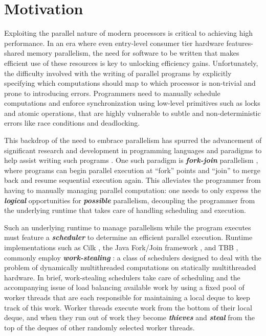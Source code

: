 \documentclass[bsc,frontabs,singlespacing,parskip,deptreport,normalheadings]{infthesis}
\begin{document}
\section{Motivation}

Exploiting the parallel nature of modern processors is critical to achieving
high performance. In an era where even entry-level consumer tier hardware
features-shared memory parallelism, the need for software to be written that
makes efficient use of these resources is key to unlocking efficiency gains.
Unfortunately, the difficulty involved with the writing of parallel programs by
explicitly specifying which computations should map to which processor is
non-trivial and prone to introducing errors. Programmers need to manually
schedule computations and enforce synchronization using low-level primitives
such as locks and atomic operations, that are highly vulnerable to subtle and
non-deterministic errors like race conditions and deadlocking.

This backdrop of the need to embrace parallelism has spurred the advancement of
significant research and development in programming languages and paradigms to
help assist writing such programs \cite{muller_latency-hiding_2016,
zakian_concurrent_2016}. One such paradigm is \textit{\textbf{fork-join}}
parallelism \cite{conway_multiprocessor_1963, nyman_notes_2016}, where programs
can begin parallel execution at ``fork'' points and ``join'' to merge back and
resume sequential execution again. This alleviates the programmer from having to
manually managing parallel computation: one needs to only express the
\textbf{\textit{logical}} opportunities for \textit{\textbf{possible}}
parallelism, decoupling the programmer from the underlying runtime that takes
care of handling scheduling and execution.

Such an underlying runtime to manage parallelism while the program executes must
feature a \textit{\textbf{scheduler}} to determine an efficient parallel
execution. Runtime implementations such as Cilk
\cite{frigo_implementation_1998}, the Java Fork/Join framework
\cite{lea_java_2000}, and TBB \cite{noauthor_advanced_nodate}, commonly employ
\textbf{\textit{work-stealing}} \cite{blumofe_cilk_1995}: a class of schedulers designed to deal with the
problem of dynamically multithreaded computations on statically multithreaded
hardware. In brief, work-stealing schedulers take care
of scheduling and the accompanying issue of load balancing available work by
using a fixed pool of worker threads that are each responsible for maintaining a
local deque to keep track of this work. Worker threads execute work from the
bottom of their local deque, and when they run out of work they become
\textit{\textbf{thieves}} and \textit{\textbf{steal}} from the top of the deques
of other randomly selected worker threads.
\end{document}
